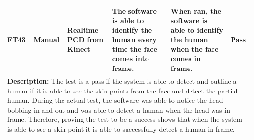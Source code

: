 \documentclass[12pt, titlepage]{article}
\begin{document}
\begin{table}[H]
{\begin{tabular}{|p{1.5cm}|p{2.5cm}|p{3cm}|p{4cm}|p{4cm}|p{1.8cm}|}
      \hline
      FT43 \label{FT43} & Manual & \raggedright Realtime PCD from Kinect \par & \raggedright The software is able to identify the human every time the face comes into frame. \par & \raggedright When ran, the software is able to identify the human when the face comes in frame. \par & Pass \\
      \hline
      \multicolumn{6}{|p{\textwidth}|}{\raggedright \textbf{Description:} The test is a pass if the system is able to detect and outline a human if it is able to see the skin points from the face and detect the partial human. During the actual test, the software was able to notice the head bobbing in and out and was able to detect a human when the head was in frame. Therefore, proving the test to be a success shows that when the system is able to see a skin point it is able to successfully detect a human in frame. \par} \\
      \hline
  \end{tabular}
  }
\end{table}
\end{document}
